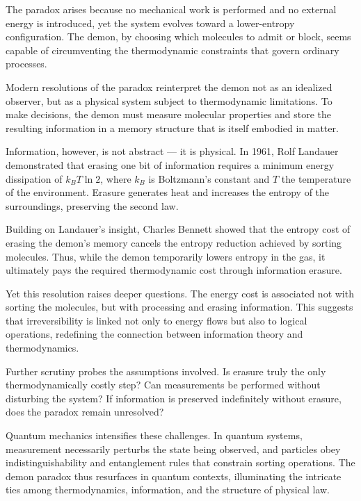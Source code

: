 The paradox arises because no mechanical work is performed and no external energy is introduced, yet the system evolves toward a lower-entropy configuration. The demon, by choosing which molecules to admit or block, seems capable of circumventing the thermodynamic constraints that govern ordinary processes.

Modern resolutions of the paradox reinterpret the demon not as an idealized observer, but as a physical system subject to thermodynamic limitations. To make decisions, the demon must measure molecular properties and store the resulting information in a memory structure that is itself embodied in matter.

Information, however, is not abstract — it is physical. In 1961, Rolf Landauer demonstrated that erasing one bit of information requires a minimum energy dissipation of $k_B T \ln 2$, where $k_B$ is Boltzmann's constant and $T$ the temperature of the environment. Erasure generates heat and increases the entropy of the surroundings, preserving the second law.

Building on Landauer's insight, Charles Bennett showed that the entropy cost of erasing the demon's memory cancels the entropy reduction achieved by sorting molecules. Thus, while the demon temporarily lowers entropy in the gas, it ultimately pays the required thermodynamic cost through information erasure.

Yet this resolution raises deeper questions. The energy cost is associated not with sorting the molecules, but with processing and erasing information. This suggests that irreversibility is linked not only to energy flows but also to logical operations, redefining the connection between information theory and thermodynamics.

Further scrutiny probes the assumptions involved. Is erasure truly the only thermodynamically costly step? Can measurements be performed without disturbing the system? If information is preserved indefinitely without erasure, does the paradox remain unresolved?

Quantum mechanics intensifies these challenges. In quantum systems, measurement necessarily perturbs the state being observed, and particles obey indistinguishability and entanglement rules that constrain sorting operations. The demon paradox thus resurfaces in quantum contexts, illuminating the intricate ties among thermodynamics, information, and the structure of physical law.


